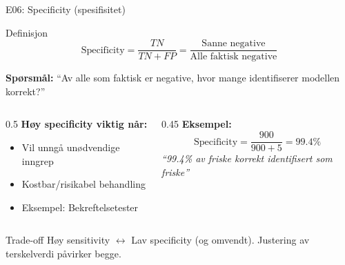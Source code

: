 \documentclass[aspectratio=169, 10pt]{beamer}
\begin{document}
\begin{frame}{E06: Specificity (spesifisitet)}
    
    \begin{block}{Definisjon}
        \[
        \text{Specificity} = \frac{TN}{TN + FP} = \frac{\text{Sanne negative}}{\text{Alle faktisk negative}}
        \]
    \end{block}
    
    \vspace{3mm}
    
    \textbf{Spørsmål:} ``Av alle som faktisk er negative, hvor mange identifiserer modellen korrekt?''
    
    \vspace{3mm}
    
    \begin{columns}
        \begin{column}{0.5\textwidth}
            \textbf{Høy specificity viktig når:}
            \begin{itemize}
                \item Vil unngå unødvendige inngrep
                \item Kostbar/risikabel behandling
                \item Eksempel: Bekreftelsetester
            \end{itemize}
        \end{column}
        
        \begin{column}{0.45\textwidth}
            \textbf{Eksempel:}
            \[
            \text{Specificity} = \frac{900}{900 + 5} = 99.4\%
            \]
            \textit{``99.4\% av friske korrekt identifisert som friske''}
        \end{column}
    \end{columns}
    
    \vspace{2mm}

    \begin{alertblock}{\footnotesize Trade-off}
        \footnotesize Høy sensitivity $\leftrightarrow$ Lav specificity (og omvendt). Justering av terskelverdi påvirker begge.
    \end{alertblock}

\end{frame}

\end{document}
